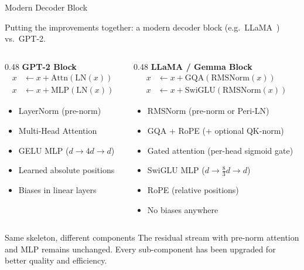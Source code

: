 \begin{frame}{Modern Decoder Block}

  Putting the improvements together: a modern decoder block (e.g.\ LLaMA~\cite{touvron2023llama}) vs.\ GPT-2.

  \vspace{0.3em}
  \begin{columns}[T]
    \begin{column}{0.48\textwidth}
      \centering\textbf{GPT-2 Block}
      \begin{align*}
        x &\leftarrow x + \text{Attn}(\text{LN}(x)) \\
        x &\leftarrow x + \text{MLP}(\text{LN}(x))
      \end{align*}

      \begin{itemize}
        \item LayerNorm (pre-norm)
        \item Multi-Head Attention
        \item GELU MLP ($d \to 4d \to d$)
        \item Learned absolute positions
        \item Biases in linear layers
      \end{itemize}
    \end{column}
    \begin{column}{0.48\textwidth}
      \centering\textbf{LLaMA / Gemma Block}
      \begin{align*}
        x &\leftarrow x + \text{GQA}(\text{RMSNorm}(x)) \\
        x &\leftarrow x + \text{SwiGLU}(\text{RMSNorm}(x))
      \end{align*}

      \begin{itemize}
        \item RMSNorm (pre-norm or Peri-LN)
        \item GQA + RoPE (+ optional QK-norm)
        \item Gated attention (per-head sigmoid gate)
        \item SwiGLU MLP ($d \to \tfrac{8}{3}d \to d$)
        \item RoPE (relative positions)
        \item No biases anywhere
      \end{itemize}
    \end{column}
  \end{columns}

  \vspace{0.5em}
  \begin{alertblock}{Same skeleton, different components}
    The residual stream with pre-norm attention and MLP remains unchanged.
    Every sub-component has been upgraded for better quality and efficiency.
  \end{alertblock}
\end{frame}

